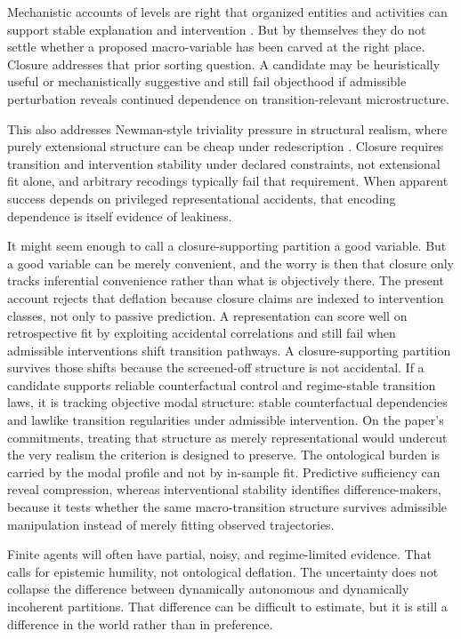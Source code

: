 Mechanistic accounts of levels are right that organized entities and
activities can support stable explanation and intervention \citep{machamer2000,craver2007}. But by themselves they do not settle whether a proposed
macro-variable has been carved at the right place. Closure addresses
that prior sorting question. A candidate may be
heuristically useful or mechanistically suggestive and still fail
objecthood if admissible perturbation reveals continued dependence on
transition-relevant microstructure.

This also addresses Newman-style triviality pressure in structural
realism, where purely extensional structure can be cheap under
redescription \citep[pp.~141--145]{ainsworth2009}.
Closure requires transition and intervention stability under declared
constraints, not extensional fit alone, and arbitrary recodings
typically fail that requirement.
When apparent success depends on privileged representational accidents,
that encoding dependence is itself evidence of leakiness.

It might seem enough to call a closure-supporting partition a good
variable. But a good variable can be merely convenient, and the worry is
then that closure only tracks inferential convenience rather than what
is objectively there. The present account rejects that deflation
because closure claims are indexed to intervention classes, not only to
passive prediction. A representation
can score well on retrospective fit by exploiting accidental
correlations and still fail when admissible interventions shift
transition pathways. A closure-supporting partition survives those
shifts because the screened-off structure is not accidental. If a
candidate supports reliable counterfactual control and regime-stable
transition laws, it is tracking objective modal structure: stable
counterfactual dependencies and lawlike transition regularities under
admissible intervention. On the paper's commitments, treating that
structure as merely representational would undercut the very realism the
criterion is designed to preserve. The ontological burden is carried by
the modal profile and not by in-sample fit. Predictive sufficiency can
reveal compression, whereas interventional stability identifies
difference-makers, because it tests whether the same macro-transition
structure survives admissible manipulation instead of merely fitting
observed trajectories.

Finite agents will often have partial, noisy, and regime-limited
evidence. That calls for epistemic humility, not ontological deflation.
The uncertainty does not collapse the difference between dynamically
autonomous and dynamically incoherent partitions. That difference can be
difficult to estimate, but it is still a difference in the world rather
than in preference.

